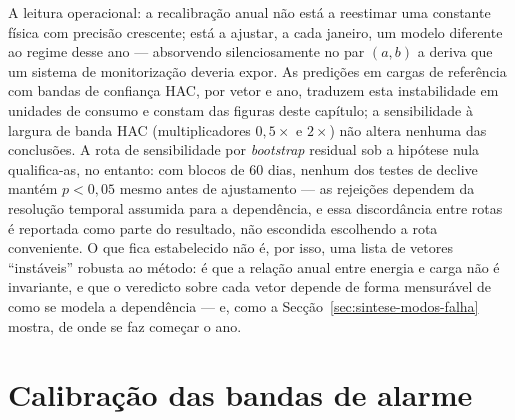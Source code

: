 A leitura operacional: a recalibração anual não está a reestimar uma constante
física com precisão crescente; está a ajustar, a cada janeiro, um modelo
diferente ao regime desse ano --- absorvendo silenciosamente no par $(a, b)$ a
deriva que um sistema de monitorização deveria expor. As predições em cargas
de referência com bandas de confiança HAC, por vetor e ano, traduzem esta
instabilidade em unidades de consumo e constam das figuras deste capítulo;
a sensibilidade à largura de banda HAC (multiplicadores $0{,}5\times$ e
$2\times$) não altera nenhuma das conclusões. A rota de sensibilidade por
\emph{bootstrap} residual sob a hipótese nula qualifica-as, no entanto: com
blocos de 60 dias, nenhum dos testes de declive mantém $p<0{,}05$ mesmo antes
de ajustamento --- as rejeições dependem da resolução temporal assumida para
a dependência, e essa discordância entre rotas é reportada como parte do
resultado, não escondida escolhendo a rota conveniente. O que fica
estabelecido não é, por isso, uma lista de vetores ``instáveis'' robusta ao
método: é que a relação anual entre energia e carga não é invariante, e que
o veredicto sobre cada vetor depende de forma mensurável de como se modela
a dependência --- e, como a Secção~\ref{sec:sintese-modos-falha} mostra, de
onde se faz começar o ano.

\section{Calibração das bandas de alarme}
\label{sec:calibracao}


